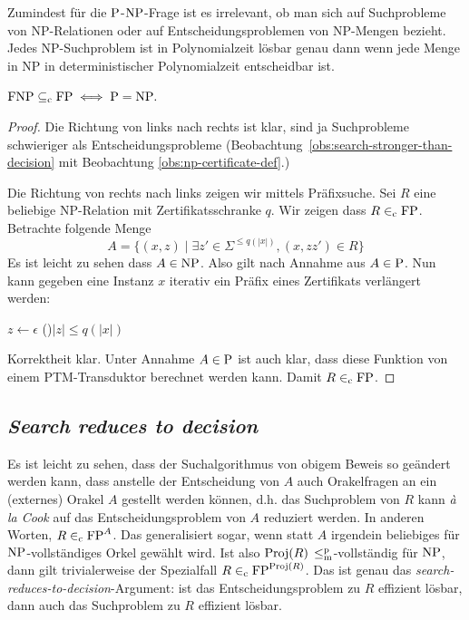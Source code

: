 Zumindest für die $\P$-$\NP$-Frage ist es irrelevant, ob man sich auf Suchprobleme von NP-Relationen oder auf Entscheidungsproblemen von NP-Mengen bezieht. Jedes NP-Suchproblem ist in Polynomialzeit lösbar genau dann wenn jede Menge in NP in deterministischer Polynomialzeit entscheidbar ist.
\begin{lemma}\label{lemma:equiv-p-np-question}
    $\FNP\subseteqc \FP \iff \P = \NP.$
\end{lemma}
\begin{proof}
    Die Richtung von links nach rechts ist klar, sind ja Suchprobleme schwieriger als Entscheidungsprobleme (Beobachtung~\ref{obs:search-stronger-than-decision} mit Beobachtung \ref{obs:np-certificate-def}.)

    Die Richtung von rechts nach links zeigen wir mittels Präfixsuche. Sei $R$ eine beliebige NP-Relation mit Zertifikatsschranke $q$. Wir zeigen dass $R\inc\FP$.
    Betrachte folgende Menge
    \[ A = \{ (x,z) \mid \exists z'\in\Sigma^{\leq q(|x|)}, (x, zz')\in R \} \]
    Es ist leicht zu sehen dass $A\in\NP$. Also gilt nach Annahme aus $A\in\P$.
    Nun kann gegeben eine Instanz $x$ iterativ ein Präfix eines Zertifikats verlängert werden:\\
    \begin{algorithm}[H]
        $z\gets\epsilon$\;
        \While(){$|z|\leq q(|x|)$}
        {
            \Else{\Reject}
        }
        \Reject
    \end{algorithm}
    \noindent
    Korrektheit klar.
    Unter Annahme $A\in\P$ ist auch klar, dass diese Funktion von einem PTM-Transduktor berechnet werden kann. Damit $R\inc\FP$.
\end{proof}

\subsection*{\emph{Search reduces to decision}}

Es ist leicht zu sehen, dass der Suchalgorithmus von obigem Beweis so geändert werden kann, dass anstelle der Entscheidung von $A$ auch Orakelfragen an ein (externes) Orakel $A$ gestellt werden können, d.h. das Suchproblem von $R$ kann \emph{à la Cook} auf das Entscheidungsproblem von $A$ reduziert werden. In anderen Worten, $R\inc \FP^A$. Das generalisiert sogar, wenn statt $A$ irgendein beliebiges für $\NP$-vollständiges Orkel gewählt wird. Ist also $\Proj(R)$ $\leqmp$-vollständig für $\NP$, dann gilt trivialerweise der Spezialfall $R\inc \FP^{\Proj(R)}$. Das ist genau das \emph{search-reduces-to-decision}-Argument: ist das Entscheidungsproblem zu $R$ effizient lösbar, dann auch das Suchproblem zu $R$ effizient lösbar.

